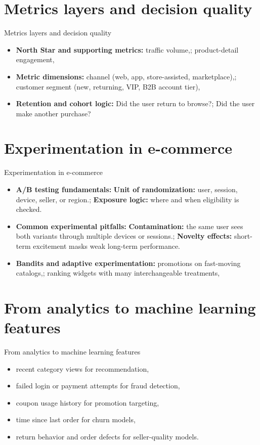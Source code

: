 \documentclass[aspectratio=169]{beamer}
\begin{document}
\section{Metrics layers and decision quality}

\begin{frame}{Metrics layers and decision quality}
  \begin{itemize}
    \item \textbf{North Star and supporting metrics:} traffic volume,; product-detail engagement,
    \item \textbf{Metric dimensions:} channel (web, app, store-assisted, marketplace),; customer segment (new, returning, VIP, B2B account tier),
    \item \textbf{Retention and cohort logic:} Did the user return to browse?; Did the user make another purchase?
  \end{itemize}
\end{frame}

\section{Experimentation in e-commerce}

\begin{frame}{Experimentation in e-commerce}
  \begin{itemize}
    \item \textbf{A/B testing fundamentals:} \textbf{Unit of randomization:} user, session, device, seller, or region.; \textbf{Exposure logic:} where and when eligibility is checked.
    \item \textbf{Common experimental pitfalls:} \textbf{Contamination:} the same user sees both variants through multiple devices or sessions.; \textbf{Novelty effects:} short-term excitement masks weak long-term performance.
    \item \textbf{Bandits and adaptive experimentation:} promotions on fast-moving catalogs,; ranking widgets with many interchangeable treatments,
  \end{itemize}
\end{frame}

\section{From analytics to machine learning features}

\begin{frame}{From analytics to machine learning features}
  \begin{itemize}
    \item recent category views for recommendation,
    \item failed login or payment attempts for fraud detection,
    \item coupon usage history for promotion targeting,
    \item time since last order for churn models,
    \item return behavior and order defects for seller-quality models.
  \end{itemize}
\end{frame}
\end{document}
